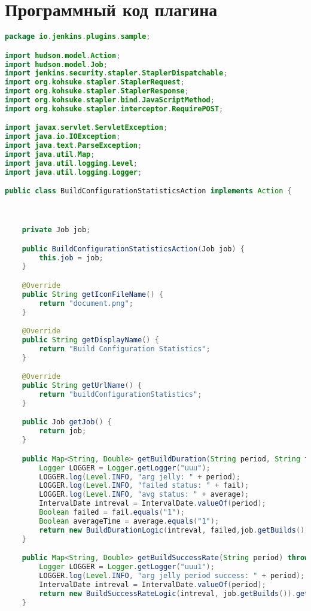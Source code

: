 \chapter{Программный код плагина}\label{appendix-extra-examples}

\begin{lstlisting}[language=Java]
package io.jenkins.plugins.sample;

import hudson.model.Action;
import hudson.model.Job;
import jenkins.security.stapler.StaplerDispatchable;
import org.kohsuke.stapler.StaplerRequest;
import org.kohsuke.stapler.StaplerResponse;
import org.kohsuke.stapler.bind.JavaScriptMethod;
import org.kohsuke.stapler.interceptor.RequirePOST;

import javax.servlet.ServletException;
import java.io.IOException;
import java.text.ParseException;
import java.util.Map;
import java.util.logging.Level;
import java.util.logging.Logger;

public class BuildConfigurationStatisticsAction implements Action {



    private Job job;

    public BuildConfigurationStatisticsAction(Job job) {
        this.job = job;
    }

    @Override
    public String getIconFileName() {
        return "document.png";
    }

    @Override
    public String getDisplayName() {
        return "Build Configuration Statistics";
    }

    @Override
    public String getUrlName() {
        return "buildConfigurationStatistics";
    }

    public Job getJob() {
        return job;
    }

    public Map<String, Double> getBuildDuration(String period, String fail, String average) throws ParseException {
        Logger LOGGER = Logger.getLogger("uuu");
        LOGGER.log(Level.INFO, "arg jelly: " + period);
        LOGGER.log(Level.INFO, "failed status: " + fail);
        LOGGER.log(Level.INFO, "avg status: " + average);
        IntervalDate intreval = IntervalDate.valueOf(period);
        Boolean failed = fail.equals("1");
        Boolean averageTime = average.equals("1");
        return new BuildDurationLogic(intreval, failed,job.getBuilds()).getBuildsDuration(averageTime);
    }

    public Map<String, Double> getBuildSuccessRate(String period) throws ParseException {
        Logger LOGGER = Logger.getLogger("uuu1");
        LOGGER.log(Level.INFO, "arg jelly period success: " + period);
        IntervalDate intreval = IntervalDate.valueOf(period);
        return new BuildSuccessRateLogic(intreval, job.getBuilds()).getSuccessRate();
    }


\end{lstlisting}

